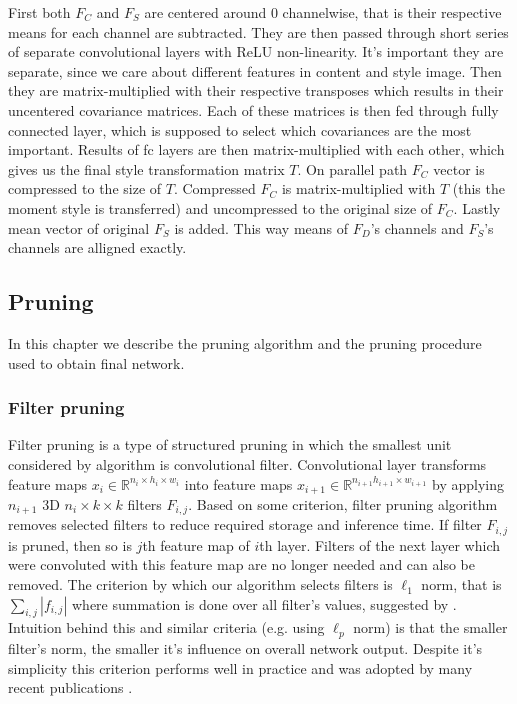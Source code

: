\documentclass[../Main.tex]{subfiles}
\begin{document}
    First both $F_C$ and $F_S$ are centered around 0 channelwise, that is their respective 
    means for each channel are subtracted. They are then passed through short series of separate 
    convolutional layers with ReLU non-linearity. It's important they are separate,
    since we care about different features in content and style image. Then they 
    are matrix-multiplied with their respective transposes which results in
    their uncentered covariance matrices. Each of these matrices is then fed 
    through fully connected layer, which is supposed to select which covariances
    are the most important. Results of fc layers are then matrix-multiplied
    with each other, which gives us the final style transformation matrix $T$.
    On parallel path $F_C$ vector is compressed to the size of $T$. Compressed 
    $F_C$ is matrix-multiplied with $T$ (this the moment style is transferred)
    and uncompressed to the original size of $F_C$. Lastly mean vector of original $F_S$
    is added. This way means of $F_D$'s channels and $F_S$'s channels are alligned
    exactly.
    
    
    
    
    
    
    
\newpage    

\subsection{Pruning}
    In this chapter we describe the pruning algorithm and the pruning procedure 
    used to obtain final network.
    \subsubsection{Filter pruning} 
    Filter pruning is a type of structured pruning in which the smallest unit considered by
    algorithm is convolutional filter. Convolutional layer transforms feature maps
    $x_i \in \mathbb{R}^{n_i \times h_i\times w_i}$ into
    feature maps  $x_{i+1} \in \mathbb{R}^{n_{i+1}h_{i+1} \times w_{i+1}}$ by applying
    $n_{i+1}$ 3D $n_i \times k \times k$ filters $F_{i,j}$. Based on some criterion, filter pruning 
    algorithm removes selected filters to reduce required storage and inference time.
    If filter $F_{i,j}$ is pruned, then so is $j$th feature map of $i$th layer. 
    Filters of the next layer which were convoluted with this feature map are no longer needed 
    and can also be removed. 
    The criterion by which our algorithm selects filters is  
    $\ell_1$ norm, that is $\sum_{i,j}|f_{i,j}|$ where summation is done
    over all filter's values, suggested by \cite{li2016pruning}.
    Intuition behind this and similar criteria (e.g. using 
    $\ell_p$ norm) is that the smaller filter's norm, the smaller it's influence 
    on overall network output. Despite it's simplicity this criterion performs well in practice
    and was adopted by many recent publications \cite{lottery1, lottery2}.
    
\end{document}
